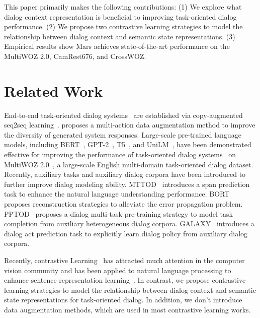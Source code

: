This paper primarily makes the following contributions:
 (1) We  explore what dialog context representation is beneficial to improving  task-oriented dialog performance.
	(2) We propose two contrastive learning strategies to model the relationship between dialog context and semantic state representations. 
	(3) Empirical results show   Mars achieves state-of-the-art  performance on the MultiWOZ 2.0, CamRest676, and CrossWOZ.

\section{Related Work}
End-to-end  task-oriented dialog systems~\cite{lei-etal-2018-sequicity,zhang-etal-2020-probabilistic,DBLP:conf/aaai/ZhangOY20} are established via copy-augmented seq2seq learning~\cite{gu-etal-2016-incorporating}.  \citet{DBLP:conf/aaai/ZhangOY20} proposes a multi-action data augmentation method to improve the diversity of generated system responses.
Large-scale pre-trained language models, including  BERT~\cite{devlin-etal-2019-bert},  GPT-2~\cite{radford2019language},   T5~\cite{2020t5}, and UniLM~\cite{DBLP:conf/nips/00040WWLWGZH19}, have been  demonstrated effective for improving the performance of task-oriented dialog systems~\cite{DBLP:conf/nips/Hosseini-AslMWY20,peng2020soloist,lin-etal-2020-mintl,DBLP:conf/aaai/YangLQ21,DBLP:journals/corr/abs-2103-06648,DBLP:journals/corr/abs-2111-14592} on MultiWOZ 2.0~\cite{budzianowski-etal-2018-multiwoz},  a large-scale English multi-domain task-oriented dialog dataset. Recently, auxiliary tasks and auxiliary dialog corpora have been introduced to further improve dialog modeling ability. MTTOD~\cite{lee-2021-improving-end} introduces a span prediction task to enhance the natural language understanding performance. BORT~\cite{2021BORTAnonymous} proposes reconstruction strategies to alleviate the error   propagation problem. 
PPTOD~\cite{DBLP:journals/corr/abs-2109-14739} proposes a dialog multi-task pre-training strategy to model task completion from  auxiliary heterogeneous dialog corpora. 
GALAXY~\cite{DBLP:journals/corr/abs-2111-14592} introduces a
dialog act prediction task to explicitly learn dialog policy from auxiliary dialog corpora.

Recently, contrastive Learning~\cite{DBLP:conf/cvpr/He0WXG20,DBLP:conf/icml/ChenK0H20,DBLP:conf/nips/GrillSATRBDPGAP20,DBLP:conf/cvpr/ChenH21} has attracted much attention in the computer vision community and has been applied to   natural language processing to enhance sentence representation learning~\cite{DBLP:journals/corr/abs-2005-12766,DBLP:journals/corr/abs-2012-15466,yan-etal-2021-consert,gao-etal-2021-simcse,giorgi-etal-2021-declutr}.  In contrast, we propose  contrastive learning strategies to model the relationship between dialog context and semantic state representations for task-oriented dialog. In addition, we don't introduce data augmentation methods, which are  used in most  contrastive learning works.

